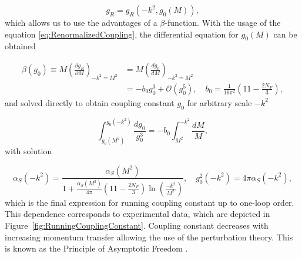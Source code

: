 \begin{equation}
  g_R = g_R(-k^2,g_0(M)),
  \label{eq:RunningCouplingConstantDependenceSchema}
\end{equation}
which allows us to use the advantages of a $\beta$-function. With the usage of the
equation \eqref{eq:RenormalizedCoupling}, the differential equation for $g_0(M)$
can be obtained

\begin{align}
  \beta(g_0) \equiv M \left( \frac{\partial g_R}{\partial M} \right)_{-k^2=M^2}
  &= M \left( \frac{dg_0}{dM} \right)_{-k^2=M^2}
  \label{eq:BetaFunction1} \\
  &= -b_0 g_0^3 + \mathscr{O}(g_0^5)
  , \quad b_0 = \frac{1}{16\pi^2}\left(11-\frac{2N_F}{3}\right),
  \label{eq:BetaFunction2}
\end{align}
and solved directly to obtain coupling constant $g_0$ for arbitrary
scale $-k^2$

\begin{equation}
  \int_{g_0(M^2)}^{g_0(-k^2)} \frac{dg_0}{g_0^3} =
  -b_0 \int_{M^2}^{-k^2}\frac{dM}{M},
  \label{eq:RunningCouplingConstantIntegralEquation}
\end{equation}
with solution

\begin{equation}
  \alpha_S(-k^2) = \frac{\alpha_S(M^2)}{1 + \frac{\alpha_S(M^2)}{4\pi} \left(
  11-\frac{2N_F}{3} \right) \ln \left( \frac{-k^2}{M^2} \right) }
  , \quad g_0^2(-k^2) = 4 \pi \alpha_S( -k^2 ),
  \label{eq:RunningCouplingConstant}
\end{equation}
which is the final expression for running coupling constant up to one-loop
order. This dependence corresponds to experimental data, which are depicted in
Figure~\ref{fig:RunningCouplingConstant}. Coupling constant decreases with
increasing momentum transfer allowing the use of the perturbation theory. This
is known as the Principle of Asymptotic Freedom \cite{AssymptoticFreedom}.

